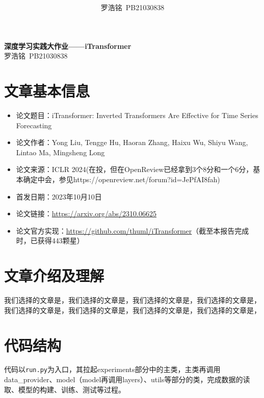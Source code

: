 \documentclass[twoside,12pt]{article}
\title{ }
\author{罗浩铭\ PB21030838}
\begin{document}
\fancyhf{} %
\fancyfoot[C]{\thepage} %
\fancyhead[l]{\footnotesize  }

\renewcommand{\headrulewidth}{0pt} %

\begin{center}
  \textbf{\LARGE{深度学习实践大作业——iTransformer}}\\
  \vspace{0.2cm}
  \large{罗浩铭\ PB21030838}
\end{center}

\section{文章基本信息}

\begin{itemize}
  \item 论文题目：iTransformer: Inverted Transformers Are Effective for Time Series Forecasting~\citep{itransformer}
  \item 论文作者：Yong Liu, Tengge Hu, Haoran Zhang, Haixu Wu, Shiyu Wang, Lintao Ma, Mingsheng Long
  \item 论文来源：ICLR 2024(在投，但在OpenReview已经拿到3个8分和一个6分，基本确定中会，参见https://openreview.net/forum?id=JePfAI8fah)
  \item 首发日期：2023年10月10日
  \item 论文链接：\url{https://arxiv.org/abs/2310.06625}
  \item 论文官方实现：\url{https://github.com/thuml/iTransformer}（截至本报告完成时，已获得443颗星）
\end{itemize}



\section{文章介绍及理解}

我们选择的文章是，我们选择的文章是，我们选择的文章是，我们选择的文章是，我们选择的文章是，我们选择的文章是，我们选择的文章是，我们选择的文章是，

\section{代码结构}

代码以\verb |run.py|为入口，其拉起experiments部分中的主类，主类再调用data_provider、model（model再调用layers）、utils等部分的类，完成数据的读取、模型的构建、训练、测试等过程。
\end{document}
